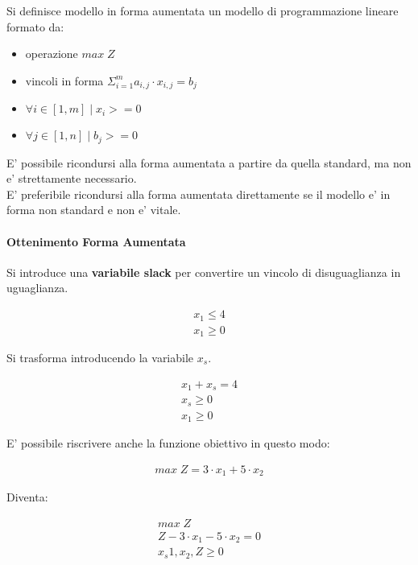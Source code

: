 Si definisce modello in forma aumentata un modello di programmazione lineare formato da:

\begin{itemize}
	\item operazione $max \; Z$
	\item vincoli in forma $\Sigma _ {i = 1} ^ {m} a_{i,j} \cdot x_{i,j} = b_j$
	\item $\forall i \in [1,m] \mid x_i >= 0$
	\item $\forall j \in [1,n] \mid b_j >= 0$
\end{itemize}

E' possibile ricondursi alla forma aumentata a partire da quella standard, ma non e' strettamente necessario. \\
E' preferibile ricondursi alla forma aumentata direttamente se il modello e' in forma non standard e non e' vitale.

\paragraph{Ottenimento Forma Aumentata}

Si introduce una \textbf{variabile slack} per convertire un vincolo di disuguaglianza in uguaglianza.

\begin{align}
    \text{$x_1 \leq 4$} \\
    \text{$x_1 \geq 0$}
\end{align}

Si trasforma introducendo la variabile $x_s$.

\begin{align}
    \text{$x_1 + x_s = 4$} \\
    \text{$x_s \geq 0$} \\
    \text{$x_1 \geq 0$}
\end{align}

E' possibile riscrivere anche la funzione obiettivo in questo modo:

\begin{align}
    \text{$max \; Z = 3 \cdot x_1 + 5 \cdot x_2$}
\end{align}

Diventa:

\begin{align}
    \text{$max \; Z$} \\
    \text{$Z - 3 \cdot x_1 - 5 \cdot x_2 = 0$} \\
    \text{$x_s1, x_2, Z \geq 0$}
\end{align}


